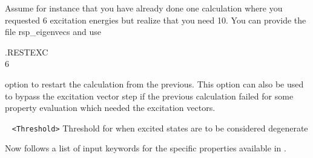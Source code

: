 \begin{description}
Assume for instance that you have already done one calculation where you requested 6 excitation 
energies but realize that you need 10. You can provide the file rsp\_eigenvecs and use

.RESTEXC\\
6 

option to restart the calculation from the previous. 
This option can also be used to bypass the excitation vector step if the previous calculation failed for some property evaluation which needed the excitation vectors.  
\item[\Key{DTHR}] \verb| | \newline
\verb|<Threshold>|\newline 
Threshold for when excited states are to be considered degenerate
\end{description}
Now follows a list of input keywords for the specific properties
available in \lsdalton.

